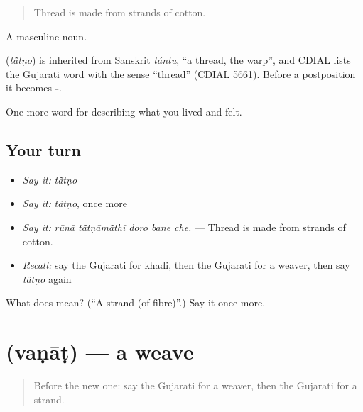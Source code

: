 \begin{quote}
Thread is made from strands of cotton.
\end{quote}

A masculine noun.

\begin{cousinweb}
\textbf{} (\emph{tā̃tṇo}) is inherited from Sanskrit \emph{tántu}, \textquotedblleft{}a thread, the warp\textquotedblright{}, and CDIAL lists the Gujarati word with the sense \textquotedblleft{}thread\textquotedblright{} (CDIAL 5661). Before a postposition it becomes \textbf{-}.
\end{cousinweb}

\begin{grammarlens}[title={What you've built}]
One more word for describing what you lived and felt.
\end{grammarlens}

\subsection*{Your turn}
\begin{itemize}
\raggedright
  \item \emph{Say it:} \emph{tā̃tṇo}
  \item \emph{Say it:} \emph{tā̃tṇo}, once more
  \item \emph{Say it:} \emph{rūnā tā̃tṇāmā̃thī doro bane che.} — Thread is made from strands of cotton.
  \item \emph{Recall:} say the Gujarati for khadi, then the Gujarati for a weaver, then say \emph{tā̃tṇo} again
\end{itemize}

\begin{tcolorbox}[breakable,colback=teal!4,colframe=teal!35!black,title={Before you move on}]
What does  mean? (\textquotedblleft{}A strand (of fibre)\textquotedblright{}.) Say it once more.
\end{tcolorbox}
\section[\texorpdfstring{\gu{વણાટ} (vaṇāṭ)}{વણાટ (vaṇāṭ)}]{ (vaṇāṭ) — a weave}

\label{lesson:GU-C506-vanat}



\begin{quote}
Before the new one: say the Gujarati for a weaver, then the Gujarati for a strand.
\end{quote}

